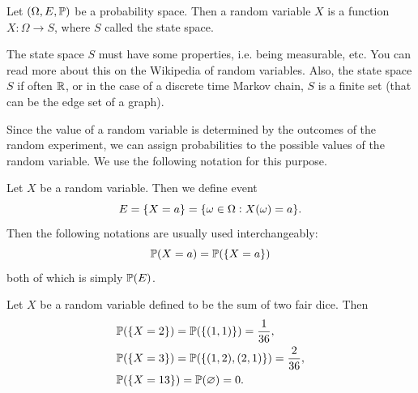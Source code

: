 \begin{definition}
	Let $(\Omega, E, \mathbb{P})$ be a probability space. Then a random variable $X$ is a function $X: \Omega \to S$, where $S$ called the state space.
\end{definition}

\begin{remark}
	The state space $S$ must have some properties, i.e. being measurable, etc. You can read more about this on the Wikipedia of random variables. Also, the state space $S$ if often $\mathbb{R}$, or in the case of a discrete time Markov chain, $S$ is a finite set (that can be the edge set of a graph).
\end{remark}

Since the value of a random variable is determined by the outcomes of the random experiment, we can assign probabilities to the possible values of the random variable. We use the following notation for this purpose.

\begin{definition}
	Let $X$ be a random variable. Then we define event 
	\[ E = \{X = a\} = \{\omega \in \Omega: X(\omega) = a\}. \]
	Then the following notations are usually used interchangeably:
	\[ \mathbb{P}(X=a) = \mathbb{P}(\{X=a\})  \]
	both of which is simply $\mathbb{P}(E)$.
\end{definition}

\begin{example}
	Let $X$ be a random variable defined to be the sum of two fair dice. Then 
	\begin{align*}
		&\mathbb{P}(\{X =2\}) = \mathbb{P}(\{(1,1)\}) = \frac{1}{36},\\
		&\mathbb{P}(\{X=3\}) = \mathbb{P}(\{(1,2),(2,1)\}) = \frac{2}{36},\\
		&\mathbb{P}(\{X=13\}) = \mathbb{P}(\varnothing) = 0.
	\end{align*}
\end{example}

